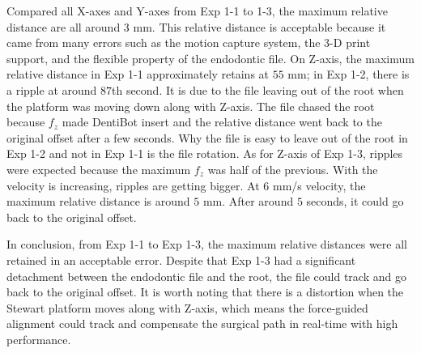 Compared all X-axes and Y-axes from Exp 1-1 to 1-3, the maximum relative distance are all around $3$ mm. This relative distance is acceptable because it came from many errors such as the motion capture system, the 3-D print support, and the flexible property of the endodontic file. On Z-axis, the maximum relative distance in Exp 1-1 approximately retains at $55$ mm; in Exp 1-2, there is a ripple at around $87$th second. It is due to the file leaving out of the root when the platform was moving down along with Z-axis. The file chased the root because $f_z$ made DentiBot insert and the relative distance went back to the original offset after a few seconds. Why the file is easy to leave out of the root in Exp 1-2 and not in Exp 1-1 is the file rotation. As for Z-axis of Exp 1-3, ripples were expected because the maximum $f_z$ was half of the previous. With the velocity is increasing, ripples are getting bigger. At $6$ mm/s velocity, the maximum relative distance is around $5$ mm. After around $5$ seconds, it could go back to the original offset.
\par
In conclusion, from Exp 1-1 to Exp 1-3, the maximum relative distances were all retained in an acceptable error. Despite that Exp 1-3 had a significant detachment between the endodontic file and the root, the file could track and go back to the original offset. It is worth noting that there is a distortion when the Stewart platform moves along with Z-axis, which means the force-guided alignment could track and compensate the surgical path in real-time with high performance.

